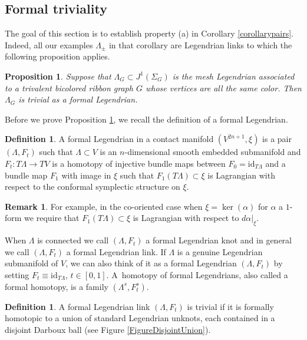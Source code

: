 \documentclass[JEP,XML,SOM,Unicode,NoFloatCountersInSection]{cedram}
\newcommand{\id}{\mathrm{id}}
\theoremstyle{plain}
\newtheorem{proposition}[theorem]{Proposition}
\theoremstyle{definition}
\newtheorem{definition}[theorem]{Definition}
\newtheorem{remark}[theorem]{Remark}
\begin{document}
\subsection{Formal triviality}\label{formal triviality}
The goal of this section is to establish property (a) in Corollary \ref{corollarypairs}. Indeed, all our examples $\Lambda_{\pm}$ in that corollary are Legendrian links to which the following proposition applies.

\begin{proposition}\label{unlinked} Suppose that $\Lambda_G \subset J^1(\Sigma_G)$ is the mesh Legendrian associated to a trivalent bicolored ribbon graph $G$ whose vertices are all the same color. Then $\Lambda_G$ is trivial as a formal Legendrian.
\end{proposition}

Before we prove Proposition \ref{unlinked}, we recall the definition of a formal Legendrian.

\begin{definition}
A formal Legendrian in a contact manifold $(V^{2n+1},\xi)$ is a pair $(\Lambda, F_t)$ such that $\Lambda \subset V$ is an $n$-dimensional smooth embedded submanifold and $F_t: T \Lambda \to TV$ is a homotopy of injective bundle maps between $F_0=\id_{T\Lambda}$ and a bundle map $F_1$ with image in $\xi$ such that $F_1(T\Lambda) \subset \xi$ is Lagrangian with respect to the conformal symplectic structure on $\xi$.
\end{definition}

\begin{remark}
For example, in the co-oriented case when $\xi= \ker(\alpha)$ for $\alpha$ a $1$-form we require that $F_1(T\Lambda) \subset \xi$ is Lagrangian with respect to $d \alpha |_\xi$.
\end{remark}

When $\Lambda$ is connected we call $(\Lambda, F_t)$ a formal Legendrian knot and in general we call $(\Lambda, F_t)$ a formal Legendrian link. If $\Lambda$ is a genuine Legendrian submanifold of $V$, we can also think of it as a formal Legendrian $(\Lambda, F_t)$ by setting $F_t \equiv \id_{T\Lambda}$, $t \in [0,1]$. A~homotopy of formal Legendrians, also called a formal homotopy, is a family $(\Lambda^s,F_t^s)$.

\begin{definition}
A formal Legendrian link $(\Lambda, F_t)$ is trivial if it is formally homotopic to a union of standard Legendrian unknots, each contained in a disjoint Darboux ball (see Figure \ref{FigureDisjointUnion}).
\end{definition}
\end{document}
